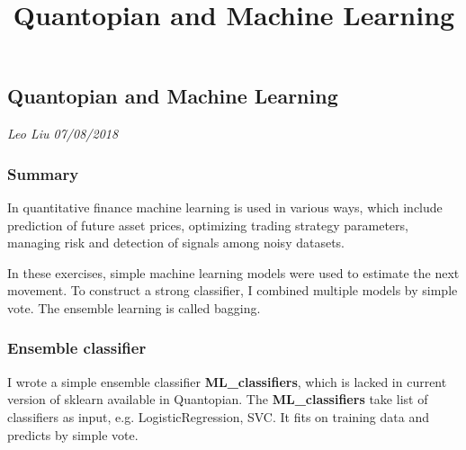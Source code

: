 \documentclass[11pt]{article}
\title{Quantopian and Machine Learning}
\begin{document}
    
    
    \maketitle
    
    

    
    \subsection{Quantopian and Machine
Learning}\label{quantopian-and-machine-learning}

    \emph{Leo Liu 07/08/2018}

    \subsubsection{Summary}\label{summary}

    In quantitative finance machine learning is used in various ways, which
include prediction of future asset prices, optimizing trading strategy
parameters, managing risk and detection of signals among noisy datasets.

In these exercises, simple machine learning models were used to estimate
the next movement. To construct a strong classifier, I combined multiple
models by simple vote. The ensemble learning is called bagging.

    \subsubsection{Ensemble classifier}\label{ensemble-classifier}

    I wrote a simple ensemble classifier \textbf{ML\_classifiers}, which is
lacked in current version of sklearn available in Quantopian. The
\textbf{ML\_classifiers} take list of classifiers as input, e.g.
LogisticRegression, SVC. It fits on training data and predicts by simple
vote.
\end{document}
